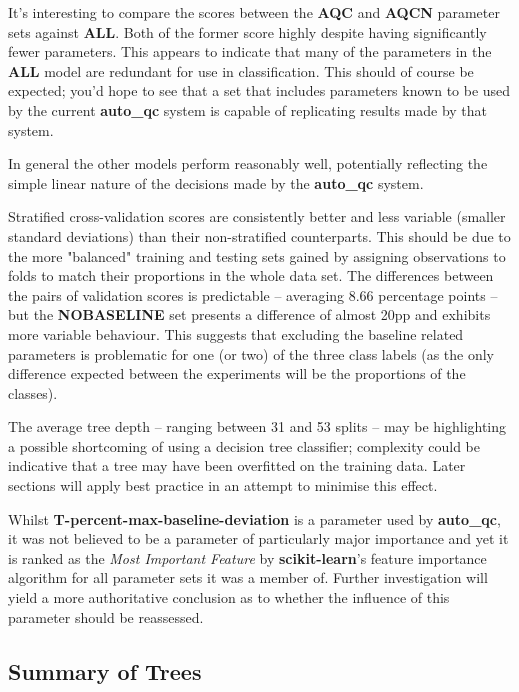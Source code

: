 It's interesting to compare the scores between the \textbf{AQC} and
\textbf{AQCN} parameter sets against \textbf{ALL}. Both of the former score
highly despite having significantly fewer parameters. This appears to indicate
that many of the parameters in the \textbf{ALL} model are redundant for use in
classification. This should of course be expected; you'd hope to see that a set
that includes parameters known to be used by the current \textbf{auto\_qc} system
is capable of replicating results made by that system.

In general the other models perform reasonably well, potentially reflecting the
simple linear nature of the decisions made by the \textbf{auto\_qc} system.

Stratified cross-validation scores are consistently better and less variable
(smaller standard deviations) than their non-stratified counterparts. This
should be due to the more "balanced" training and testing sets
gained by assigning observations to folds to match their proportions in the
whole data set. The differences between the pairs of validation scores is
predictable -- averaging 8.66 percentage points -- but the \textbf{NOBASELINE}
set presents a difference of almost 20pp and exhibits more variable behaviour.
This suggests that excluding the baseline related parameters is problematic for
one (or two) of the three class labels (as the only difference expected between the
experiments will be the proportions of the classes).

The average tree depth -- ranging between 31 and 53 splits -- may be
highlighting a possible shortcoming of using a decision tree classifier;
complexity could be indicative that a tree may have been overfitted on the training
data. Later sections will apply best practice in an attempt to minimise this
effect.

Whilst \textbf{T-percent-max-baseline-deviation} is a parameter used by
\textbf{auto\_qc}, it was not believed to be a parameter of
particularly major importance and yet it is ranked as the \textit{Most
Important Feature} by \textbf{scikit-learn}'s feature importance algorithm
for all parameter sets it was a member of. Further investigation will yield a
more authoritative conclusion as to whether the influence of this parameter
should be reassessed.


\subsection{Summary of Trees}

